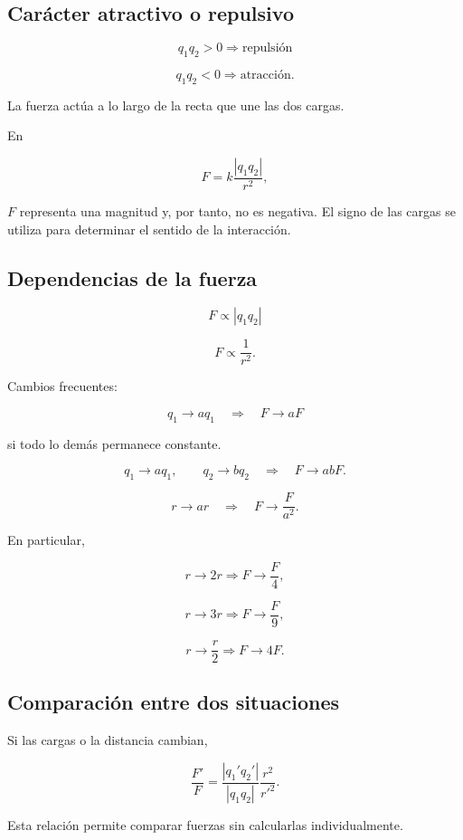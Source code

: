 \subsection{Carácter atractivo o repulsivo}

\[
\boxed{q_1q_2>0\Longrightarrow\text{repulsión}}
\]

\[
\boxed{q_1q_2<0\Longrightarrow\text{atracción}}.
\]

La fuerza actúa a lo largo de la recta que une las dos cargas.

\begin{advertencia}
En

\[
F=k\frac{|q_1q_2|}{r^2},
\]

\(F\) representa una magnitud y, por tanto, no es negativa. El signo de las cargas se utiliza para determinar el sentido de la interacción.
\end{advertencia}


\subsection{Dependencias de la fuerza}

\[
\boxed{F\propto |q_1q_2|}
\]

\[
\boxed{F\propto\frac{1}{r^2}}.
\]

Cambios frecuentes:

\[
q_1\to aq_1
\quad\Longrightarrow\quad
F\to aF
\]

si todo lo demás permanece constante.

\[
q_1\to aq_1,\qquad q_2\to bq_2
\quad\Longrightarrow\quad
F\to abF.
\]

\[
r\to ar
\quad\Longrightarrow\quad
F\to\frac{F}{a^2}.
\]

En particular,

\[
r\to2r\Longrightarrow F\to\frac{F}{4},
\]

\[
r\to3r\Longrightarrow F\to\frac{F}{9},
\]

\[
r\to\frac{r}{2}\Longrightarrow F\to4F.
\]


\subsection{Comparación entre dos situaciones}

Si las cargas o la distancia cambian,

\[
\boxed{
\frac{F'}{F}
=
\frac{|q_1'q_2'|}{|q_1q_2|}
\frac{r^2}{r'^2}
}.
\]

Esta relación permite comparar fuerzas sin calcularlas individualmente.


